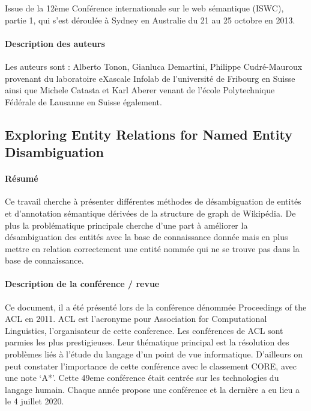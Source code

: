 \documentclass{article}
\begin{document}
Issue de la 12ème Conférence internationale sur le web sémantique (ISWC), partie 1, qui s’est déroulée à Sydney en Australie du 21 au 25 octobre en 2013.


\paragraph{Description des auteurs}

Les auteurs sont :
Alberto Tonon, Gianluca Demartini, Philippe Cudré-Mauroux provenant du laboratoire eXascale Infolab de l'université de Fribourg en Suisse ainsi que Michele Catasta et Karl Aberer venant de l'école Polytechnique Fédérale de Lausanne en Suisse également.

\subsection{Exploring Entity Relations for Named Entity Disambiguation \cite{article-13}}

\paragraph{Résumé}
Ce travail cherche à présenter différentes méthodes de désambiguation de entités et d’annotation sémantique dérivées de la structure de graph de Wikipédia. De plus la problématique principale cherche d’une part à améliorer la désambiguation des entités avec la base de connaissance donnée mais en plus mettre en relation correctement une entité nommée qui ne se trouve pas dans la base de connaissance.


\paragraph{Description de la conférence / revue}
Ce document, il a été présenté lors de la conférence dénommée Proceedings of the ACL en 2011. ACL est l’acronyme pour Association for Computational Linguistics, l’organisateur de cette conference.
Les conférences de ACL sont parmies les plus prestigieuses. Leur thématique principal est la résolution des problèmes liés à l’étude du langage d’un point de vue informatique. 
D’ailleurs on peut constater l’importance de cette conférence avec le classement CORE, avec une note ‘A*’.
Cette 49eme conférence était centrée sur les technologies du langage humain. Chaque année propose une conférence et la dernière a eu lieu a le 4 juillet 2020.
\end{document}
